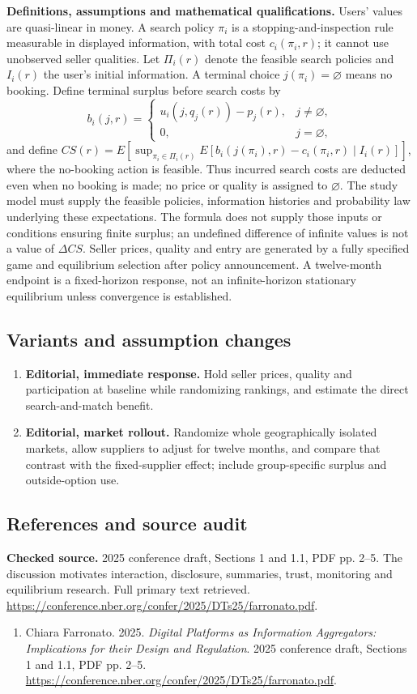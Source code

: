 \documentclass[11pt,a4paper]{article}
\begin{document}
\textbf{Definitions, assumptions and mathematical qualifications.} Users' values are quasi-linear in money. A search policy \(\pi_i\) is a stopping-and-inspection rule measurable in displayed information, with total cost \(c_i(\pi_i,r)\); it cannot use unobserved seller qualities. Let \(\Pi_i(r)\) denote the feasible search policies and \(I_i(r)\) the user's initial information. A terminal choice \(j(\pi_i)=\varnothing\) means no booking. Define terminal surplus before search costs by
\[
 b_i(j,r)=\begin{cases}
 u_i(j,q_j(r))-p_j(r),&j\ne\varnothing,\\
 0,&j=\varnothing,
 \end{cases}
\]
and define \(CS(r)=E[\sup_{\pi_i\in\Pi_i(r)}E[b_i(j(\pi_i),r)-c_i(\pi_i,r)\mid I_i(r)]]\), where the no-booking action is feasible. Thus incurred search costs are deducted even when no booking is made; no price or quality is assigned to \(\varnothing\). The study model must supply the feasible policies, information histories and probability law underlying these expectations. The formula does not supply those inputs or conditions ensuring finite surplus; an undefined difference of infinite values is not a value of \(\Delta CS\). Seller prices, quality and entry are generated by a fully specified game and equilibrium selection after policy announcement. A twelve-month endpoint is a fixed-horizon response, not an infinite-horizon stationary equilibrium unless convergence is established.
\subsection*{Variants and assumption changes}
\begin{enumerate}
\item \textbf{Editorial, immediate response.} Hold seller prices, quality and participation at baseline while randomizing rankings, and estimate the direct search-and-match benefit.
\item \textbf{Editorial, market rollout.} Randomize whole geographically isolated markets, allow suppliers to adjust for twelve months, and compare that contrast with the fixed-supplier effect; include group-specific surplus and outside-option use.
\end{enumerate}
\subsection*{References and source audit}
\textbf{Checked source.} 2025 conference draft, Sections 1 and 1.1, PDF pp. 2--5. The discussion motivates interaction, disclosure, summaries, trust, monitoring and equilibrium research. Full primary text retrieved. \url{https://conference.nber.org/confer/2025/DTs25/farronato.pdf}.
\begin{enumerate}\raggedright
\item\hypertarget{definitions:source:30007682:1}{} Chiara Farronato. 2025. \emph{Digital Platforms as Information Aggregators: Implications for their Design and Regulation}. 2025 conference draft, Sections 1 and 1.1, PDF pp. 2--5.
\url{https://conference.nber.org/confer/2025/DTs25/farronato.pdf}.
\end{enumerate}
\end{document}
